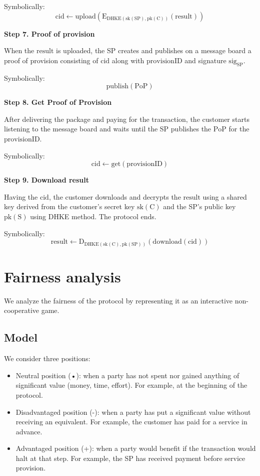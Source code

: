 Symbolically: 
\[
\mathrm{cid \gets upload(E_{DHKE(sk(SP), pk(C))}(result))}
\]

\noindent \textbf
{Step 7. Proof of provision}\label{step-7-proof-of-provision}

When the $\mathrm{result}$ is uploaded, the SP creates and publishes on a message board a proof of provision consisting of $\mathrm{cid}$ along with $\mathrm{provisionID}$ and signature $\mathrm{sig}_\mathrm{SP}$.

Symbolically: 
\[
\mathrm{publish(PoP)}
\]

\noindent \textbf
{Step 8. Get Proof of Provision}\label{step-8-get-proof-of-provision}

After delivering the package and paying for the transaction, the customer starts listening to the message board and waits until the SP publishes the $\mathrm{PoP}$ for the $\mathrm{provisionID}$.

Symbolically: 
\[
\mathrm{cid \gets get(provisionID)}
\]

\noindent \textbf
{Step 9. Download result}\label{step-9-download-result}

Having the $\mathrm{cid}$, the customer downloads and decrypts the $\mathrm{result}$ using a shared key derived from the customer's secret key $\mathrm{sk(C)}$ and the SP's public key $\mathrm{pk(S)}$ using DHKE method. The protocol ends.

Symbolically: 
\[
\mathrm{result \gets D_{DHKE(sk(C), pk(SP))}(download(cid))}
\]

\section{Fairness analysis}\label{sec:fairness-analysis}
We analyze the fairness of the protocol by representing it as an interactive non-cooperative game.

\subsection{Model}\label{sec:fairness-model}
We consider three positions:

\begin{itemize}
\item Neutral position (•): when a party has not spent nor gained anything of significant value (money, time, effort). For example, at the beginning of the protocol.
\item Disadvantaged position (-): when a party has put a significant value without receiving an equivalent. For example, the customer has paid for a service in advance.
\item Advantaged position (+): when a party would benefit if the transaction would halt at that step. For example, the SP has received payment before service provision.
\end{itemize}

